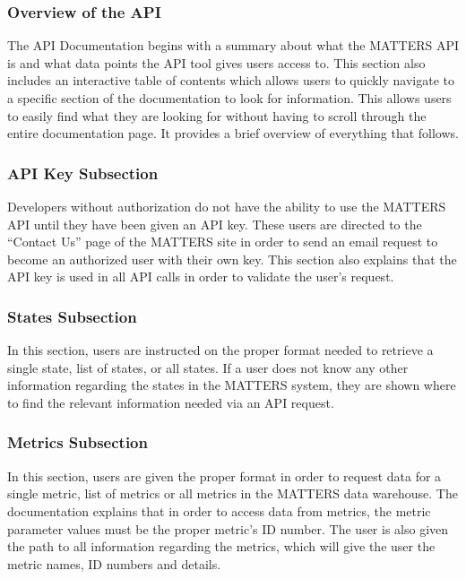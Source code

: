 				
			\subsubsection{Overview of the API}
				
				The API Documentation begins with a summary about what the MATTERS API is and what 
				data points the API tool gives users access to. This section also includes an 
				interactive table of contents which allows users to quickly navigate to a specific 
				section of the documentation to look for information. This allows users to easily 
				find what they are looking for without having to scroll through the entire 
				documentation page. It provides a brief overview of everything that follows.
				
			\subsubsection{API Key Subsection}
				
				Developers without authorization do not have the ability to use the MATTERS API 
				until they have been given an API key. These users are directed to the “Contact Us” 
				page of the MATTERS site in order to send an email request to become an authorized user with their own key. 
				This section also explains that the API key is used in all 
				API calls in order to validate the user's request.
				
			\subsubsection{States Subsection}
				
				In this section, users are instructed on the proper format needed to retrieve a single state, 
				list of states, or all states. If a user does not know any other information 
				regarding the states in the MATTERS system, they are shown where to find the relevant
				information needed via an API request.
				
			\subsubsection{Metrics Subsection}
				
				In this section, users are given the proper format in order to request data for a single metric, 
				list of metrics or all metrics in the MATTERS data warehouse. The documentation explains 
				that in order to access data from metrics, the metric parameter values must be the 
				proper metric's ID number. The user is also given the path to all information 
				regarding the metrics, which will give the user the metric names, ID numbers and details.
				
